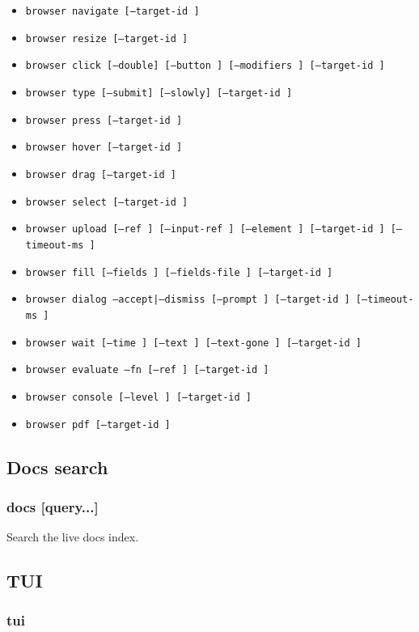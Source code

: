 \begin{itemize}
  \item \texttt{browser navigate  [--target-id ]}
  \item \texttt{browser resize   [--target-id ]}
  \item \texttt{browser click  [--double] [--button ] [--modifiers ] [--target-id ]}
  \item \texttt{browser type   [--submit] [--slowly] [--target-id ]}
  \item \texttt{browser press  [--target-id ]}
  \item \texttt{browser hover  [--target-id ]}
  \item \texttt{browser drag   [--target-id ]}
  \item \texttt{browser select   [--target-id ]}
  \item \texttt{browser upload  [--ref ] [--input-ref ] [--element ] [--target-id ] [--timeout-ms ]}
  \item \texttt{browser fill [--fields ] [--fields-file ] [--target-id ]}
  \item \texttt{browser dialog --accept|--dismiss [--prompt ] [--target-id ] [--timeout-ms ]}
  \item \texttt{browser wait [--time ] [--text ] [--text-gone ] [--target-id ]}
  \item \texttt{browser evaluate --fn  [--ref ] [--target-id ]}
  \item \texttt{browser console [--level ] [--target-id ]}
  \item \texttt{browser pdf [--target-id ]}
\end{itemize}


\subsection{Docs search}


\subsubsection{docs [query...]}


Search the live docs index.

\subsection{TUI}


\subsubsection{tui}


